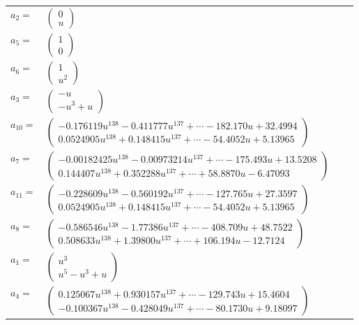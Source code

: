 \documentclass[1p]{elsarticle_modified}
\theoremstyle{definition}
\begin{document}
\begin{tabular}{m{7pt} m{180pt} m{7pt} m{180pt} }
\flushright $a_{2}=$&$\begin{pmatrix}0\\u\end{pmatrix}$ \\
\flushright $a_{5}=$&$\begin{pmatrix}1\\0\end{pmatrix}$ \\
\flushright $a_{6}=$&$\begin{pmatrix}1\\u^2\end{pmatrix}$ \\
\flushright $a_{3}=$&$\begin{pmatrix}- u\\- u^3+u\end{pmatrix}$ \\
\flushright $a_{10}=$&$\begin{pmatrix}-0.176119 u^{138}-0.411777 u^{137}+\cdots-182.170 u+32.4994\\0.0524905 u^{138}+0.148415 u^{137}+\cdots-54.4052 u+5.13965\end{pmatrix}$ \\
\flushright $a_{7}=$&$\begin{pmatrix}-0.00182425 u^{138}-0.00973214 u^{137}+\cdots-175.493 u+13.5208\\0.144407 u^{138}+0.352288 u^{137}+\cdots+58.8870 u-6.47093\end{pmatrix}$ \\
\flushright $a_{11}=$&$\begin{pmatrix}-0.228609 u^{138}-0.560192 u^{137}+\cdots-127.765 u+27.3597\\0.0524905 u^{138}+0.148415 u^{137}+\cdots-54.4052 u+5.13965\end{pmatrix}$ \\
\flushright $a_{8}=$&$\begin{pmatrix}-0.586546 u^{138}-1.77386 u^{137}+\cdots-408.709 u+48.7522\\0.508633 u^{138}+1.39800 u^{137}+\cdots+106.194 u-12.7124\end{pmatrix}$ \\
\flushright $a_{1}=$&$\begin{pmatrix}u^3\\u^5- u^3+u\end{pmatrix}$ \\
\flushright $a_{4}=$&$\begin{pmatrix}0.125067 u^{138}+0.930157 u^{137}+\cdots-129.743 u+15.4604\\-0.100367 u^{138}-0.428049 u^{137}+\cdots-80.1730 u+9.18097\end{pmatrix}$ \\

\end{tabular}
\end{document}
